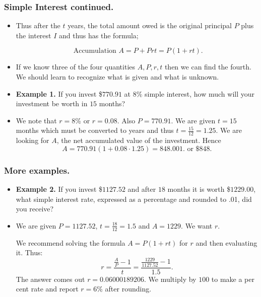 \begin{frame}%
  \frametitle{Simple Interest continued.}
  \begin{itemize}%

\item 
Thus after the $t$ years, the total amount owed is the original
principal $P$ plus the interest $I$ and thus has the formula;

$$\mbox{ Accumulation } A = P + Prt = P(1+rt).$$

\item If we know three of the four quantities $A,P,r,t$ then we can find
the fourth. We should learn to recognize what is given and what is
unknown.

\item {\bf Example 1.} If you invest \$$770.91$ at $8$\% simple interest,
how much will your investment be worth in $15$ months?
\item
We note that $r=8$\% or $r=0.08$. Also $P=770.91$. We are given $t=15$
months which must be converted to years and thus $t=\frac{15}{12} =
1.25$. We are looking for $A$, the net accumulated value of the investment.
Hence
$$A=770.91(1+0.08\cdot 1.25) = 848.001. \mbox{ or \$$848$.}$$




\end{itemize}
\end{frame}
%


\begin{frame}%
  \frametitle{More examples.}
  \begin{itemize}%

\item
{\bf Example 2.}
If you invest \$$1127.52$ and after $18$ months it is worth \$$1229.00$,
what simple interest rate, expressed as a percentage and rounded to .01,
did you receive?
\item We are given $P=1127.52$, $t=\frac{18}{12}=1.5$ and $A=1229$.
We want $r$.

We recommend solving the formula $A=P(1+rt)$ for $r$ and then evaluating
it. Thus:
$$r=\frac{\frac{A}{P}-1}{t} = \frac{\frac{1229}{1127.52}-1}{1.5}.$$
The answer comes out $r=0.06000189206$. We multiply by $100$ to make a
per cent rate and report $r=6$\% after rounding.

\end{itemize}
\end{frame}



